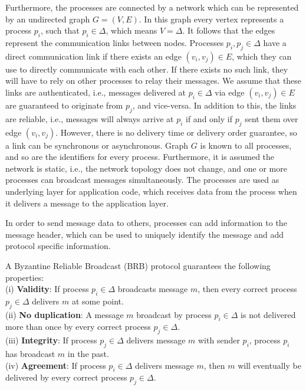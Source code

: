 Furthermore, the processes are connected by a network which can be represented by an undirected graph $G=(V,E)$. In this graph every vertex represents a process $p_i$, such that $p_i \in \Delta$, which means $V=\Delta$. It follows that the edges represent the communication links between nodes.
Processes $p_i, p_j \in \Delta$ have a direct communication link if there exists an edge $(v_i, v_j) \in E$, which they can use to directly communicate with each other. If there exists no such link, they will have to rely on other processes to relay their messages. We assume that these links are authenticated, i.e., messages delivered at $p_i \in \Delta$ via edge $(v_i, v_j) \in E$ are guaranteed to originate from $p_j$, and vice-versa. In addition to this, the links are reliable, i.e., messages will always arrive at $p_i$ if and only if $p_j$ sent them over edge $(v_i, v_j)$. However, there is no delivery time or delivery order guarantee, so a link can be synchronous or asynchronous. Graph $G$ is known to all processes, and so are the identifiers for every process. Furthermore, it is assumed the network is static, i.e., the network topology does not change, and one or more processes can broadcast messages simultaneously. The processes are used as underlying layer for application code, which receives data from the process when it delivers a message to the application layer.

In order to send message data to others, processes can add information to the message header, which can be used to uniquely identify the message and add protocol specific information.

A Byzantine Reliable Broadcast (BRB) protocol guarantees the following properties:\\
(i) \textbf{Validity}: If process $p_i \in \Delta$ broadcasts message $m$, then every correct process $p_j \in \Delta$ delivers $m$ at some point.\\
(ii) \textbf{No duplication}: A message $m$ broadcast by process $p_i \in \Delta$ is not delivered more than once by every correct process $p_j \in \Delta$.\\
(iii) \textbf{Integrity}: If process $p_j \in \Delta$ delivers message $m$ with sender $p_i$, process $p_i$ has broadcast $m$ in the past.\\
(iv) \textbf{Agreement}: If process $p_i \in \Delta$ delivers message $m$, then $m$ will eventually be delivered by every correct process $p_j \in \Delta$.

